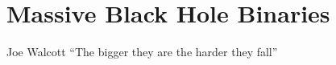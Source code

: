 \part[Massive Black Hole Binaries]{Massive Black Hole Binaries} \label{partI}


\vspace{-16pt} \begin{chapquote}{Joe Walcott} \singlespacing ``The bigger they are the harder they fall'' 
 \end{chapquote} \vspace{-8pt}
\noindent\makebox[\linewidth]{\rule{0.5\textwidth}{0.5pt}} \vspace{1pt}






















